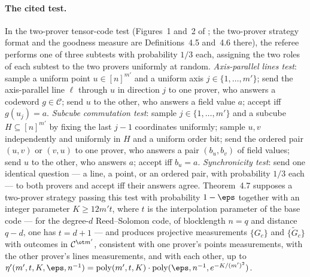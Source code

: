\documentclass[11pt]{article}
\begin{document}
\paragraph{The cited test.}
In the two-prover tensor-code test (Figures~1 and~2 of
\cite{Ji2021Quantum}; the two-prover strategy format and the goodness
measure are Definitions~4.5 and~4.6 there), the referee performs one of
three subtests with probability $1/3$ each, assigning the two roles of each
subtest to the two provers uniformly at random.  \emph{Axis-parallel lines
test}: sample a uniform point $u \in [n]^{m'}$ and a uniform axis
$j \in \{1,\ldots,m'\}$; send the axis-parallel line $\ell$ through $u$ in
direction $j$ to one prover, who answers a codeword $g \in \mathcal C$;
send $u$ to the other, who answers a field value $a$; accept iff
$g(u_j) = a$.  \emph{Subcube commutation test}: sample
$j \in \{1,\ldots,m'\}$ and a subcube $H \subseteq [n]^{m'}$ by fixing the
last $j-1$ coordinates uniformly; sample $u, v$ independently and uniformly
in $H$ and a uniform order bit; send the ordered pair $(u,v)$ or $(v,u)$ to
one prover, who answers a pair $(b_u, b_v)$ of field values; send $u$ to
the other, who answers $a$; accept iff $b_u = a$.  \emph{Synchronicity
test}: send one identical question --- a line, a point, or an ordered
pair, with probability $1/3$ each --- to both provers and accept iff their
answers agree.  Theorem~4.7 supposes a two-prover strategy passing this
test with probability $1-\eps$ together with an integer parameter
$K \ge 12 m' t$, where $t$ is the interpolation parameter of the base code
--- for the degree-$d$ Reed--Solomon code, of blocklength $n = q$ and
distance $q-d$, one has $t = d+1$ --- and produces projective measurements
$\{G_c\}$ and $\{\tilde G_c\}$ with outcomes in $\mathcal C^{\ot m'}$,
consistent with one prover's points measurements, with the other prover's
lines measurements, and with each other, up to
$\eta'(m',t,K,\eps,n^{-1}) = \mathrm{poly}(m',t,K) \cdot
\mathrm{poly}(\eps, n^{-1}, e^{-K/(m')^2})$.
\end{document}
